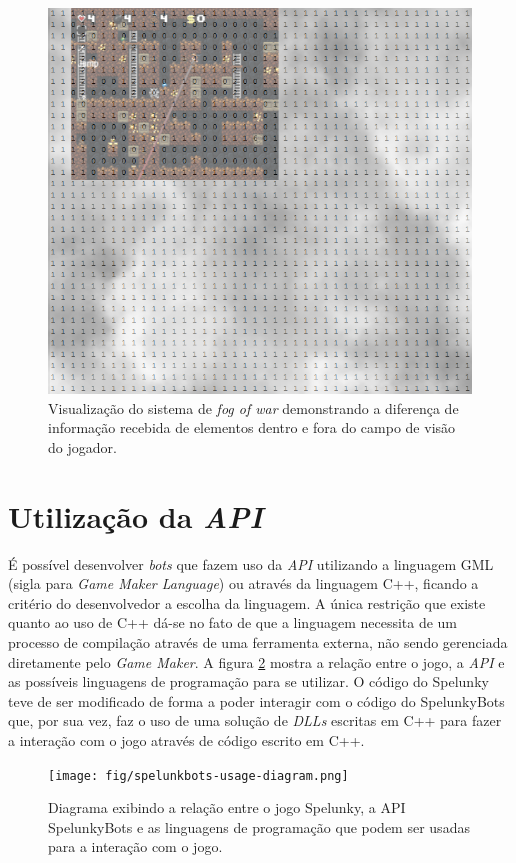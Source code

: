 \begin{figure}[htb!]
\centering
\includegraphics[width=.65\textwidth]{fig/spelunkbots-fow.png}
\caption {\label{fig:spelunkbots-fow}Visualização do sistema de \textit{fog of
war} demonstrando a diferença de informação recebida de elementos dentro e fora
do campo de visão do jogador.}
\end{figure}

\section{Utilização da \textit{API}}

É possível desenvolver \textit{bots} que fazem uso da \textit{API}
utilizando a linguagem GML (sigla para \textit{Game Maker Language}) ou
através da linguagem C++, ficando a critério do desenvolvedor a escolha da
linguagem. A única restrição que existe quanto ao uso de C++ dá-se no fato
de que a linguagem necessita de um processo de compilação através de uma
ferramenta externa, não sendo gerenciada diretamente pelo \textit{Game
Maker}. A figura \ref{fig:spelunkbots-usage-diagram} mostra a relação entre
o jogo, a \textit{API} e as possíveis linguagens de programação para se
utilizar. O código do Spelunky teve de ser modificado de forma a poder
interagir com o código do SpelunkyBots que, por sua vez, faz o uso de uma
solução de \textit{DLLs} escritas em C++ para fazer a interação com o jogo
através de código escrito em C++.

\begin{figure}[htb!]
\centering
\texttt{[image: fig/spelunkbots-usage-diagram.png]}
\caption {\label{fig:spelunkbots-usage-diagram}Diagrama exibindo a relação
entre o jogo Spelunky, a API SpelunkyBots e as linguagens de programação que
podem ser usadas para a interação com o jogo.}
\end{figure}

